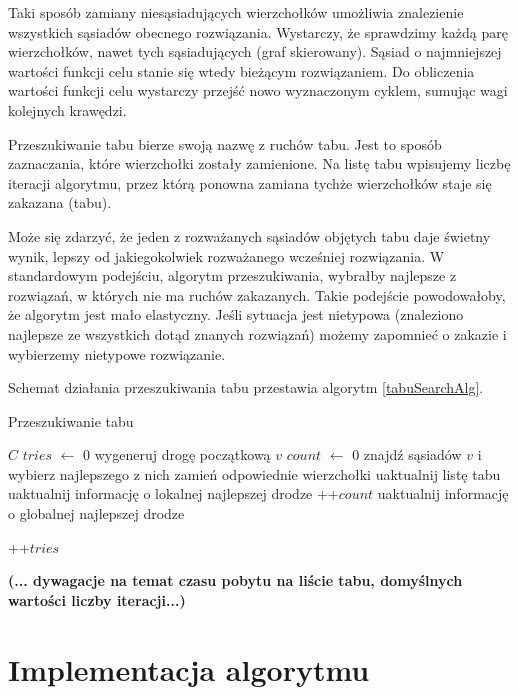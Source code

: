 \documentclass[11pt,a4paper,twoside]{article}
\begin{document}
Taki sposób zamiany niesąsiadujących wierzchołków umożliwia znalezienie wszystkich sąsiadów obecnego rozwiązania. Wystarczy, że sprawdzimy każdą parę wierzchołków, nawet tych sąsiadujących (graf skierowany). Sąsiad o najmniejszej wartości funkcji celu stanie się wtedy bieżącym rozwiązaniem. Do obliczenia wartości funkcji celu wystarczy przejść nowo wyznaczonym cyklem, sumując wagi kolejnych krawędzi.

Przeszukiwanie tabu bierze swoją nazwę z ruchów tabu. Jest to sposób zaznaczania, które wierzchołki zostały zamienione. Na listę tabu wpisujemy liczbę iteracji algorytmu, przez którą ponowna zamiana tychże wierzchołków staje się zakazana (tabu). 

Może się zdarzyć, że jeden z rozważanych sąsiadów objętych tabu daje świetny wynik, lepszy od jakiegokolwiek rozważanego wcześniej rozwiązania. W standardowym podejściu, algorytm przeszukiwania, wybrałby najlepsze z rozwiązań, w których nie ma ruchów zakazanych. Takie podejście powodowałoby, że algorytm jest mało elastyczny. Jeśli sytuacja jest nietypowa (znaleziono najlepsze ze wszystkich dotąd znanych rozwiązań) możemy zapomnieć o zakazie i wybierzemy nietypowe rozwiązanie. 

Schemat działania przeszukiwania tabu przestawia algorytm \ref{tabuSearchAlg}.

\begin{algorithm}[ht]
\caption{Przeszukiwanie tabu}
\label{tabuSearchAlg}
\begin{algorithmic}%
\Require $C$
	\State $tries$ $\leftarrow$ 0
		\State wygeneruj drogę początkową $v$
		\State $count$ $\leftarrow$ 0
			\State znajdź sąsiadów $v$ i wybierz najlepszego z nich
			\State zamień odpowiednie wierzchołki
			\State uaktualnij listę tabu
				\State uaktualnij informację o lokalnej najlepszej drodze
				\State ++$count$
					\State uaktualnij informację o globalnej najlepszej drodze
					
    			\EndIf
    		\EndIf
		\EndWhile
		\State ++$tries$
	\EndWhile
\end{algorithmic}
\end{algorithm}


\textbf{(... dywagacje na temat czasu pobytu na liście tabu, domyślnych wartości liczby iteracji...)}

\section{Implementacja algorytmu}
\end{document}

